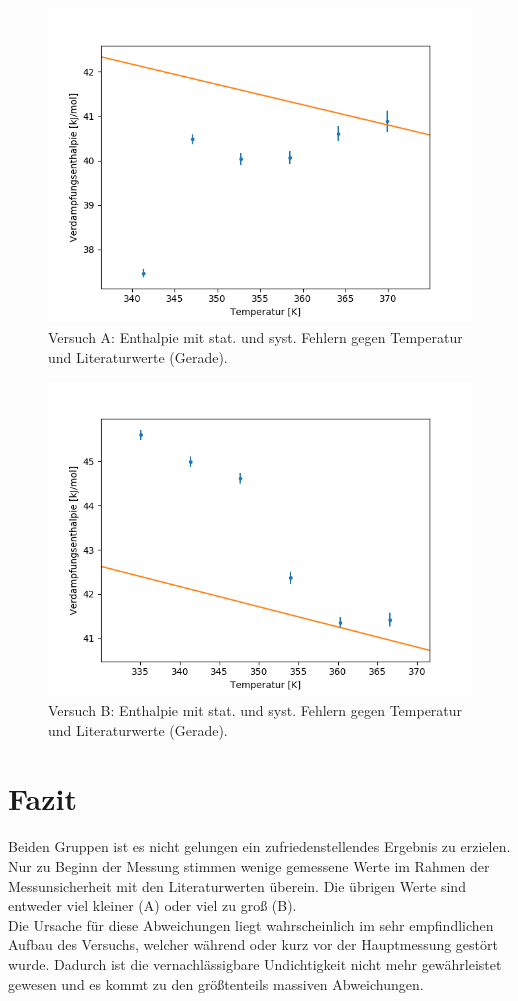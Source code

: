 \documentclass[12pt,a4paper]{article}
\begin{document}
\begin{figure}
\begin{center}
\includegraphics[width=0.8\linewidth]{Bilder/Enthalpie_gegen_TempA}
\caption{Versuch A: Enthalpie mit stat. und syst. Fehlern gegen Temperatur und Literaturwerte (Gerade).}
\label{fig:EntTempA}
\end{center}
\end{figure}
\begin{figure}[H]
\begin{center}
\includegraphics[width=0.8\linewidth]{Bilder/Enthalpie_gegen_TempB}
\caption{Versuch B: Enthalpie mit stat. und syst. Fehlern gegen Temperatur und Literaturwerte (Gerade).}
\label{fig:EntTempB}
\end{center}
\end{figure}






\section{Fazit}
Beiden Gruppen ist es nicht gelungen ein zufriedenstellendes Ergebnis zu erzielen. Nur zu Beginn der Messung stimmen wenige gemessene Werte im Rahmen der Messunsicherheit mit den Literaturwerten überein. Die übrigen Werte sind entweder viel kleiner (A) oder viel zu groß (B).\\
Die Ursache für diese Abweichungen liegt wahrscheinlich im sehr empfindlichen Aufbau des Versuchs, welcher  während oder kurz vor der Hauptmessung gestört wurde. Dadurch ist die vernachlässigbare Undichtigkeit nicht mehr gewährleistet gewesen und es kommt zu den größtenteils massiven Abweichungen.
\end{document}
